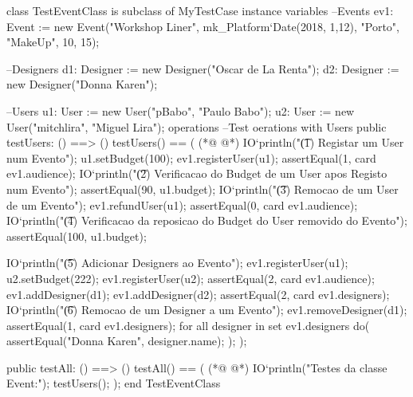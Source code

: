 \begin{vdmpp}[breaklines=true]
class TestEventClass is subclass of MyTestCase
instance variables
 --Events
 ev1: Event := new Event("Workshop Liner", mk_Platform`Date(2018, 1,12), "Porto", "MakeUp", 10, 15);
 
 --Designers
 d1: Designer := new Designer("Oscar de La Renta");
 d2: Designer := new Designer("Donna Karen");
 
 --Users
 u1: User := new User("pBabo", "Paulo Babo");
 u2: User := new User("mitchlira", "Miguel Lira");
operations
 --Test oerations with Users
 public testUsers: () ==> ()
 testUsers() == (
(*@
\label{testUsers:17}
@*)
  IO`println("\t (1) Registar um User num Evento");
  u1.setBudget(100);
  ev1.registerUser(u1);
  assertEqual(1, card ev1.audience);
  IO`println("\t (2) Verificacao do Budget de um User apos Registo num Evento");
  assertEqual(90, u1.budget);
  IO`println("\t (3) Remocao de um User de um Evento");
  ev1.refundUser(u1);
  assertEqual(0, card ev1.audience);
  IO`println("\t (4) Verificacao da reposicao do Budget do User removido do Evento");
  assertEqual(100, u1.budget);
  
  IO`println("\t (5) Adicionar Designers ao Evento");
  ev1.registerUser(u1);
  u2.setBudget(222);
  ev1.registerUser(u2);
  assertEqual(2, card ev1.audience);
  ev1.addDesigner(d1);
  ev1.addDesigner(d2);
  assertEqual(2, card ev1.designers);
  IO`println("\t (6) Remocao de um Designer a um Evento");
  ev1.removeDesigner(d1);
  assertEqual(1, card ev1.designers);
  for all designer in set ev1.designers do(
   assertEqual("Donna Karen", designer.name);
  );
 );
 
 public testAll: () ==> ()
  testAll() == (
(*@
\label{testAll:47}
@*)
  IO`println("Testes da classe Event:");
  testUsers();
  );
end TestEventClass
\end{vdmpp}


